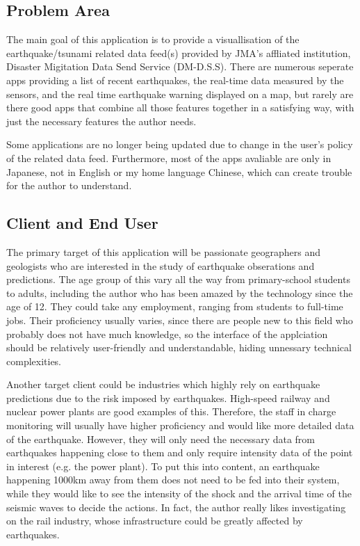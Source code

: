 \documentclass{article}
\begin{document}
\subsection{Problem Area}
The main goal of this application is to provide a visuallisation of the earthquake/tsunami related data feed(s) provided by JMA's affliated institution, Disaster Migitation Data Send Service (DM-D.S.S). There are numerous seperate apps providing a list of recent earthquakes, the real-time data measured by the sensors, and the real time earthquake warning displayed on a map, but rarely are there good apps that combine all those features together in a satisfying way, with just the necessary features the author needs.

Some applications are no longer being updated due to change in the user's policy of the related data feed. Furthermore, most of the apps avaliable are only in Japanese, not in English or my home language Chinese, which can create trouble for the author to understand.

\subsection{Client and End User}
The primary target of this application will be passionate geographers and geologists who are interested in the study of earthquake obserations and predictions. The age group of this vary all the way from primary-school students to adults, including the author who has been amazed by the technology since the age of 12. They could take any employment, ranging from students to full-time jobs. Their proficiency usually varies, since there are people new to this field who probably does not have much knowledge, so the interface of the applciation should be relatively user-friendly and understandable, hiding unnessary technical complexities.

Another target client could be industries which highly rely on earthquake predictions due to the risk imposed by earthquakes. High-speed railway and nuclear power plants are good examples of this. Therefore, the staff in charge monitoring will usually have higher proficiency and would like more detailed data of the earthquake. However, they will only need the necessary data from earthquakes happening close to them and only require intensity data of the point in interest (e.g. the power plant). To put this into content, an earthquake happening 1000km away from them does not need to be fed into their system, while they would like to see the intensity of the shock and the arrival time of the seismic waves to decide the actions. In fact, the author really likes investigating on the rail industry, whose infrastructure could be greatly affected by earthquakes.
\end{document}
